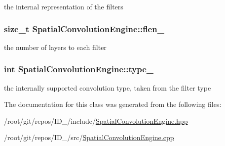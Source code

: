 the internal representation of the filters 

\hypertarget{classSpatialConvolutionEngine_a5d58b30ec6846ef7ccf98f980d4fc957}{
\subsubsection[{flen\-\_\-}]{\setlength{\rightskip}{0pt plus 5cm}size\-\_\-t {\bf \-Spatial\-Convolution\-Engine\-::flen\-\_\-}}}\label{classSpatialConvolutionEngine_a5d58b30ec6846ef7ccf98f980d4fc957}


the number of layers to each filter 

\hypertarget{classSpatialConvolutionEngine_a913adab567840b6d1b2407c3b22ca108}{
\subsubsection[{type\-\_\-}]{\setlength{\rightskip}{0pt plus 5cm}int {\bf \-Spatial\-Convolution\-Engine\-::type\-\_\-}}}\label{classSpatialConvolutionEngine_a913adab567840b6d1b2407c3b22ca108}


the internally supported convolution type, taken from the filter type 



\-The documentation for this class was generated from the following files\-:\begin{DoxyCompactItemize}
\item 
/root/git/repos/\-I\-D\-\_/include/\hyperlink{SpatialConvolutionEngine_8hpp}{\-Spatial\-Convolution\-Engine.\-hpp}\item 
/root/git/repos/\-I\-D\-\_/src/\hyperlink{SpatialConvolutionEngine_8cpp}{\-Spatial\-Convolution\-Engine.\-cpp}\end{DoxyCompactItemize}
